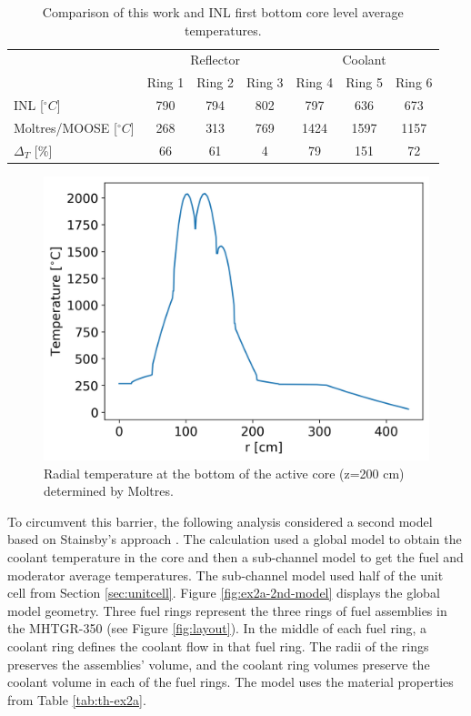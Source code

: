 \begin{table}[htbp!]
\centering
      \caption{Comparison of this work and INL \cite{strydom_inl_2013} first bottom core level average temperatures.}
      \label{tab:th-ex2a-1st-results}
\begin{tabular}{lcccccc}
    \toprule
                & \multicolumn{3}{c}{Reflector} & \multicolumn{3}{c}{Coolant}   \\
                & Ring 1   & Ring 2   & Ring 3   & Ring 4   & Ring 5  & Ring 6  \\
    \midrule
INL [$^{\circ}C$]           & 790    & 794     & 802     & 797     & 636     & 673     \\
Moltres/MOOSE [$^{\circ}C$] & 268    & 313     & 769     & 1424    & 1597    & 1157    \\
$\Delta_T$ [\%]    & 66       & 61     & 4       & 79      & 151     & 72      \\
    \bottomrule
  \end{tabular}
\end{table}

\begin{figure}[htbp!]
  \centering
  \includegraphics[width=0.45\linewidth]{figures-thermal/ex2a-across}
  \hfill
  \caption{Radial temperature at the bottom of the active core (z=200 cm) determined by Moltres.}
  \label{fig:ex2a-1st-model-across}
\end{figure}

To circumvent this barrier, the following analysis considered a second model based on Stainsby's approach \cite{stainsby_investigation_2008}.
The calculation used a global model to obtain the coolant temperature in the core and then a sub-channel model to get the fuel and moderator average temperatures.
The sub-channel model used half of the unit cell from Section \ref{sec:unitcell}.
Figure \ref{fig:ex2a-2nd-model} displays the global model geometry.
Three fuel rings represent the three rings of fuel assemblies in the MHTGR-350 (see Figure \ref{fig:layout}).
In the middle of each fuel ring, a coolant ring defines the coolant flow in that fuel ring.
The radii of the rings preserves the assemblies' volume, and the coolant ring volumes preserve the coolant volume in each of the fuel rings.
The model uses the material properties from Table \ref{tab:th-ex2a}.

